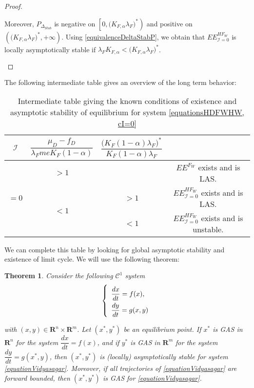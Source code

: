 \documentclass{article}
\newcommand{\lfw}{\lambda_{F}}
\newcommand{\lfw}{\lambda_{F}}
\newcommand{\Kfa}{K_{F,\alpha}}
\newcommand{\cI}{\mathcal{I}}
\newtheorem{theorem}{Theorem}
\begin{document}
\begin{proof}
\begin{itemize}
Moreover, $P_{\Delta_{Stab}}$ is negative on $\left[0, \Big(\Kfa \lfw \Big)^* \right)$ and positive on $\left(\Big(\Kfa \lfw \Big)^*, +\infty \right)$. Using \eqref{equivalenceDeltaStabP}, we obtain that $EE^{HF_W}_{\cI = 0}$ is locally asymptotically stable if $\lfw \Kfa < \Big(\Kfa \lfw \Big)^*$.

\end{itemize}
\end{proof}


The following intermediate table gives an overview of the long term behavior:

\begin{table}[!ht]
\centering
\def\arraystretch{2}
\begin{tabular}{c|c|c|c}
$\cI$ & $\dfrac{\mu_D - f_D}{\lfw m e K_F(1-\alpha)}$ &  $\dfrac{\Big(K_F(1-\alpha) \lfw \Big)^*}{K_F(1-\alpha) \lfw}$ & \\
\hline
\multirow{3}{*}{$=0$} & $ > 1$ & &$EE^{F_W}$ exists and is LAS.  \\
\cline{2-4}
 & \multirow{2}{*}{$< 1$} & $>1$ &$EE^{HF_W}_{\cI=0}$ exists and is LAS.\\
 \cline{3-4}
 & & $ <1$ &$EE^{HF_W}_{\cI=0}$ exists and is unstable.
\end{tabular}
\caption{\centering Intermediate table giving the known conditions of existence and asymptotic stability of equilibrium for system \eqref{equationsHDFWHW, cI=0}}
\end{table}

We can complete this table by looking for global asymptotic stability and existence of limit cycle. We will use the following theorem:

\begin{theorem}\label{theoremVidyasagar} \cite{vidyasagar_decomposition_1980, dumont_mathematical_2012}
Consider the following $\mathcal{C}^1$ system
\begin{equation}
\def\arraystretch{2}
\left\{ \begin{array}{l}
\dfrac{dx}{dt} = f(x), \\
\dfrac{dy}{dt} = g(x, y) 
\end{array} \right.
\label{equationVidyasagar}
\end{equation}

with $(x, y) \in \mathbf{R}^n \times\mathbf{R}^m$. Let $(x^*, y^*)$ be an equilibrium point.
If $x^*$ is GAS in $\mathbf{R}^n$ for the system $\dfrac{dx}{dt} = f(x)$, and if $y^*$ is GAS in $\mathbf{R}^m$ for the system $\dfrac{dy}{dt} = g(x^*, y)$, then $(x^*, y^*)$ is (locally) asymptotically stable for system \eqref{equationVidyasagar}. Moreover, if all trajectories of \eqref{equationVidyasagar} are forward bounded, then $(x^*, y^*)$ is GAS for \eqref{equationVidyasagar}.
\end{theorem}
\end{document}
